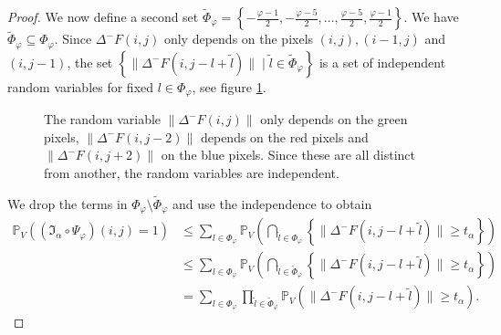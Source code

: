 \documentclass[a4paper,12pt]{article}
\newcommand{\norm}[1]{\lVert#1\rVert}
\theoremstyle{plain}
\theoremstyle{definition}
\begin{document}
\begin{proof}
	We now define a second set $\tilde{\Phi}_\varphi = \left\{ -\frac{\varphi - 1}{2}, -\frac{\varphi - 5}{2}, \dots, \frac{\varphi - 5}{2}, \frac{\varphi - 1}{2} \right\}$. We have $\tilde{\Phi}_\varphi \subseteq \Phi_\varphi$. Since $\Delta^- F(i, j)$ only depends on the pixels $(i, j), (i - 1, j)$ and $(i, j - 1)$, the set $\left\{ \norm{\Delta^- F(i, j - l + \tilde{l})} \mid \tilde{l} \in \tilde{\Phi}_\varphi \right\}$ is a set of independent random variables for fixed $l \in \Phi_\varphi$, see figure \ref{fig: independentpoints}.
	
	\begin{figure}[h]
		\centering
		\caption{The random variable $\norm{\Delta^- F(i, j)}$ only depends on the green pixels, $\norm{\Delta^- F(i, j - 2)}$ depends on the red pixels and $\norm{\Delta^- F(i, j + 2)}$ on the blue pixels. Since these are all distinct from another, the random variables are independent.}
		\label{fig: independentpoints}
	\end{figure}
	
	We drop the terms in $\Phi_\varphi \setminus \tilde{\Phi}_\varphi$ and use the independence to obtain
	\begin{align*}
		\mathbb{P}_V\left( (\mathfrak{I}_\alpha \circ \Psi_\varphi)(i, j) = 1 \right) &\leq \sum_{l \in \Phi_\varphi} \mathbb{P}_V\left( \bigcap_{\tilde{l} \in \Phi_\varphi} \left\{ \norm{\Delta^- F(i, j - l + \tilde{l})} \geq t_\alpha \right\} \right) \\
		&\leq \sum_{l \in \Phi_\varphi} \mathbb{P}_V\left( \bigcap_{\tilde{l} \in \tilde{\Phi}_\varphi} \left\{ \norm{\Delta^- F(i, j - l + \tilde{l})} \geq t_\alpha \right\} \right) \\
		&= \sum_{l \in \Phi_\varphi} \prod_{\tilde{l} \in \tilde{\Phi}_\varphi} \mathbb{P}_V\left( \norm{\Delta^- F(i, j - l + \tilde{l})} \geq t_\alpha \right).
	\end{align*}
	

\end{proof}
\end{document}
